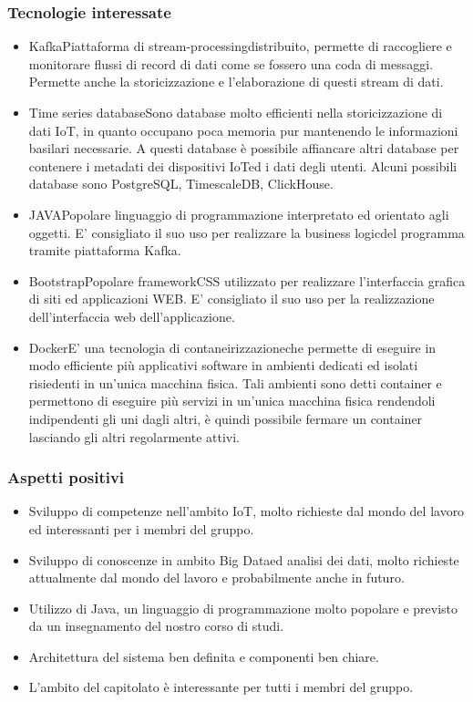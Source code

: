 \subsubsection{Tecnologie interessate}
\begin{itemize}
	\item Kafka\glosp Piattaforma di stream-processing\glosp distribuito, permette di raccogliere e monitorare flussi di record di dati come se fossero una coda di messaggi. Permette anche la storicizzazione e l'elaborazione di questi stream di dati.	
	\item Time series database\glosp Sono database molto efficienti nella storicizzazione di dati IoT\glo, in quanto occupano poca memoria pur mantenendo le informazioni basilari necessarie. A questi database è possibile affiancare altri database per contenere i metadati dei dispositivi IoT\glosp ed i dati degli utenti. Alcuni possibili database sono PostgreSQL\glo, TimescaleDB\glo, ClickHouse\glo.
	\item JAVA\glosp Popolare linguaggio di programmazione interpretato ed orientato agli oggetti. E' consigliato il suo uso per realizzare la business logic\glosp del programma tramite piattaforma Kafka\glo.
	\item Bootstrap\glosp Popolare framework\glosp CSS utilizzato per realizzare l'interfaccia grafica di siti ed applicazioni WEB. E' consigliato il suo uso per la realizzazione dell'interfaccia web dell'applicazione.
	\item Docker\glosp E' una tecnologia di contaneirizzazione\glosp che permette di eseguire in modo efficiente più applicativi software in ambienti dedicati ed isolati risiedenti in un'unica macchina fisica. Tali ambienti sono detti container e permettono di eseguire più servizi in un'unica macchina fisica rendendoli indipendenti gli uni dagli altri, è quindi possibile fermare un container lasciando gli altri regolarmente attivi.
\end{itemize} 
\subsubsection{Aspetti positivi}
\begin{itemize} 
	\item Sviluppo di competenze nell'ambito IoT\glo, molto richieste dal mondo del lavoro ed interessanti per i membri del gruppo.
	\item Sviluppo di conoscenze in ambito Big Data\glosp ed analisi dei dati, molto richieste attualmente dal mondo del lavoro e probabilmente anche in futuro.
	\item Utilizzo di Java, un linguaggio di programmazione molto popolare e previsto da un insegnamento del nostro corso di studi.
	\item Architettura del sistema ben definita e componenti ben chiare.
	\item L'ambito del capitolato è interessante per tutti i membri del gruppo.
\end{itemize}
